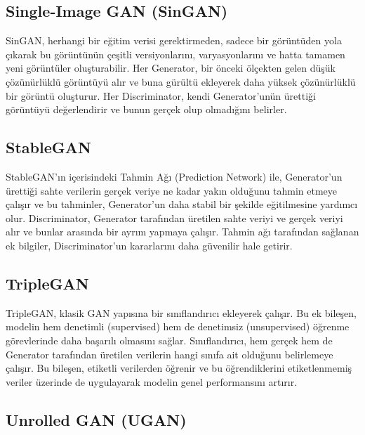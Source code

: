 \newpage

\subsection{Single-Image GAN (SinGAN)}

SinGAN, herhangi bir eğitim verisi gerektirmeden, sadece bir görüntüden yola çıkarak bu görüntünün çeşitli versiyonlarını, varyasyonlarını ve hatta tamamen yeni görüntüler oluşturabilir. Her Generator, bir önceki ölçekten gelen düşük çözünürlüklü görüntüyü alır ve buna gürültü ekleyerek daha yüksek çözünürlüklü bir görüntü oluşturur. Her Discriminator, kendi Generator'unün ürettiği görüntüyü değerlendirir ve bunun gerçek olup olmadığını belirler.

\newpage

\subsection{StableGAN}

StableGAN'ın içerisindeki Tahmin Ağı (Prediction Network) ile, Generator'un ürettiği sahte verilerin gerçek veriye ne kadar yakın olduğunu tahmin etmeye çalışır ve bu tahminler, Generator'un daha stabil bir şekilde eğitilmesine yardımcı olur. Discriminator, Generator tarafından üretilen sahte veriyi ve gerçek veriyi alır ve bunlar arasında bir ayrım yapmaya çalışır. Tahmin ağı tarafından sağlanan ek bilgiler, Discriminator'un kararlarını daha güvenilir hale getirir.

\newpage

\subsection{TripleGAN}

TripleGAN, klasik GAN yapısına bir sınıflandırıcı ekleyerek çalışır. Bu ek bileşen, modelin hem denetimli (supervised) hem de denetimsiz (unsupervised) öğrenme görevlerinde daha başarılı olmasını sağlar. Sınıflandırıcı, hem gerçek hem de Generator tarafından üretilen verilerin hangi sınıfa ait olduğunu belirlemeye çalışır. Bu bileşen, etiketli verilerden öğrenir ve bu öğrendiklerini etiketlenmemiş veriler üzerinde de uygulayarak modelin genel performansını artırır.

\newpage

\subsection{Unrolled GAN (UGAN)}

